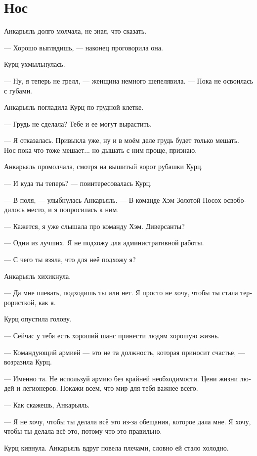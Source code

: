 \documentclass[a4paper,12pt,fleqn]{book}\usepackage{polyglossia}\setdefaultlanguage[babelshorthands=true]{russian}\setotherlanguage{english}\defaultfontfeatures{Ligatures=TeX,Mapping=tex-text}\usepackage{xcolor}\newcommand{\ml}[3]{#2}
\begin{document}
\section{Нос}

Анкарьяль долго молчала, не зная, что сказать.

--- Хорошо выглядишь, --- наконец проговорила она.

Курц ухмыльнулась.

--- Ну, я теперь не грелл, --- женщина немного шепелявила.
--- Пока не освоилась с губами.

Анкарьяль погладила Курц по грудной клетке.

--- Грудь не сделала?
Тебе и ее могут вырастить.

--- Я отказалась.
Привыкла уже, ну и в моём деле грудь будет только мешать.
Нос пока что тоже мешает... но дышать с ним проще, признаю.

Анкарьяль промолчала, смотря на вышитый ворот рубашки Курц.

--- И куда ты теперь? --- поинтересовалась Курц.

--- В поля, --- улыбнулась Анкарьяль.
--- В команде Хэм Золотой Посох освободилось место, и я попросилась к ним.

--- Кажется, я уже слышала про команду Хэм.
Диверсанты?

--- Одни из лучших.
Я не подхожу для административной работы.

--- С чего ты взяла, что для неё подхожу я?

Анкарьяль хихикнула.

--- Да мне плевать, подходишь ты или нет.
Я просто не хочу, чтобы ты стала террористкой, как я.

Курц опустила голову.

--- Сейчас у тебя есть хороший шанс принести людям хорошую жизнь.

--- Командующий армией --- это не та должность, которая приносит счастье, --- возразила Курц.

--- Именно та.
Не используй армию без крайней необходимости.
Цени жизни людей и легионеров.
Покажи всем, что мир для тебя важнее всего.

--- Как скажешь, Анкарьяль.

--- Я не хочу, чтобы ты делала всё это из-за обещания, которое дала мне.
Я хочу, чтобы ты делала всё это, потому что это правильно.

Курц кивнула.
Анкарьяль вдруг повела плечами, словно ей стало холодно.
\end{document}
